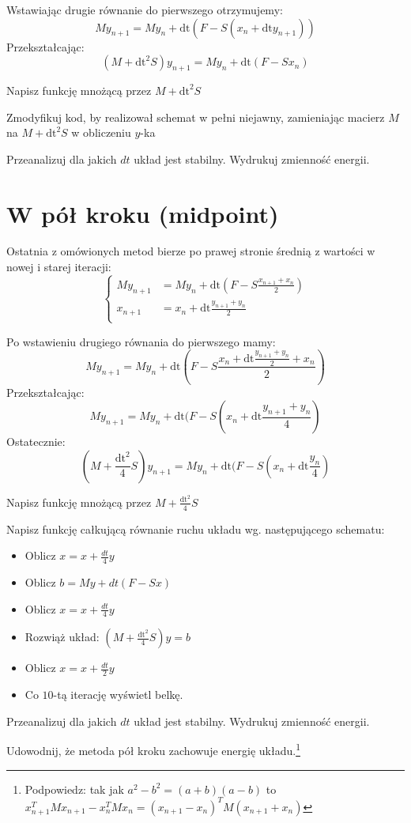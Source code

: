 \documentclass{instrukcja}
\begin{document}
Wstawiając drugie równanie do pierwszego otrzymujemy:
\[My_{n+1} = My_n + \text{dt}( F - S(x_n + \text{dt} y_{n+1}))\]
Przekształcając:
\[(M+\text{dt}^2S)y_{n+1} = My_n + \text{dt}( F - S x_n)\]
\begin{zad}Napisz funkcję mnożącą przez $M+\text{dt}^2S$\end{zad}
\begin{zad}Zmodyfikuj kod, by realizował schemat w pełni niejawny, zamieniając macierz $M$ na $M+\text{dt}^2S$ w obliczeniu $y$-ka\end{zad}
\begin{zad} Przeanalizuj dla jakich $dt$ układ jest stabilny. Wydrukuj zmienność energii. \end{zad}

\section{W pół kroku (midpoint)}

Ostatnia z omówionych metod bierze po prawej stronie średnią z wartości w nowej i starej iteracji:
\[\begin{cases}
My_{n+1} &= My_n + \text{dt}( F - S\frac{x_{n+1}+x_{n}}{2})\\
x_{n+1} &= x_n + \text{dt} \frac{y_{n+1}+y_{n}}{2}\\
\end{cases}\]

Po wstawieniu drugiego równania do pierwszego mamy:
\[My_{n+1} = My_n + \text{dt}( F - S\frac{x_n + \text{dt} \frac{y_{n+1}+y_{n}}{2}+x_{n}}{2})\]
Przekształcając:
\[My_{n+1} = My_n + \text{dt}( F - S(x_n + \text{dt} \frac{y_{n+1}+y_{n}}{4})\]
Ostatecznie:
\[(M + \frac{\text{dt}^2}{4}S)y_{n+1} = My_n + \text{dt}( F - S(x_n + \text{dt} \frac{y_{n}}{4})\]

\begin{zad}Napisz funkcję mnożącą przez $M+\frac{\text{dt}^2}{4}S$\end{zad}
\begin{zad}Napisz funkcję całkującą równanie ruchu układu wg. następującego schematu:
\begin{itemize}
\item Oblicz $x = x + \frac{dt}{4} y$
\item Oblicz $b = My + dt(F - Sx)$
\item Oblicz $x = x + \frac{dt}{4} y$
\item Rozwiąż układ: $(M + \frac{\text{dt}^2}{4}S)y=b$
\item Oblicz $x = x + \frac{dt}{2} y$
\item Co $10$-tą iterację wyświetl belkę.
\end{itemize}\end{zad}
\begin{zad} Przeanalizuj dla jakich $dt$ układ jest stabilny. Wydrukuj zmienność energii. \end{zad}
\begin{zad} Udowodnij, że metoda pół kroku zachowuje energię układu.\footnote{Podpowiedz: tak jak $a^2-b^2=(a+b)(a-b)$ to $x_{n+1}^TMx_{n+1} - x_{n}^TMx_{n} = (x_{n+1} - x_{n})^TM(x_{n+1} +
x_{n})$}\end{zad}
\end{document}
